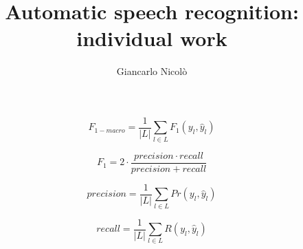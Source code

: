 \documentclass[]{article}
\title{Automatic speech recognition: individual work}
\author{Giancarlo Nicolò}
\date{}
\begin{document}
\begin{equation}
F_{1-macro} = \frac{1}{|L|} \displaystyle\sum_{l\in L} F_1(y_l, \hat{y}_l)
\end{equation}

\begin{equation}
F_1 = 2 \cdot \frac{precision \cdot recall }{precision + recall}
\end{equation}

\begin{equation}
precision = \frac{1}{|L|} \displaystyle\sum_{l\in L} Pr(y_l, \hat{y}_l)
\end{equation}

\begin{equation}
recall = \frac{1}{|L|} \displaystyle\sum_{l\in L} R(y_l, \hat{y}_l)
\end{equation}
\end{document}

